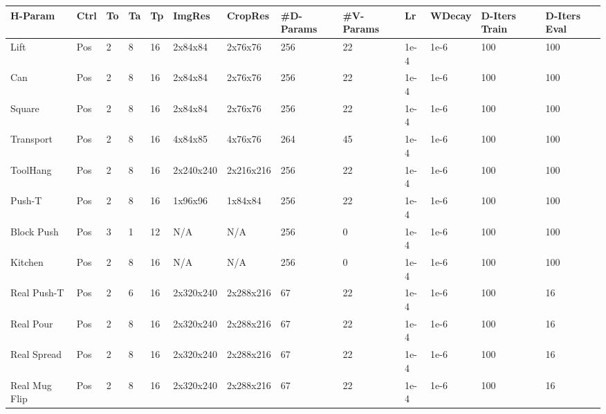 \setlength\tabcolsep{3 pt}
\small
\begin{tabular}{l|llllllllllll}
\toprule
           
\textbf{H-Param} & \textbf{Ctrl} & \textbf{To} & \textbf{Ta} & \textbf{Tp} & \textbf{ImgRes} & \textbf{CropRes} & \textbf{\#D-Params} & \textbf{\#V-Params} & \textbf{Lr} & \textbf{WDecay} & \textbf{D-Iters Train} & \textbf{D-Iters Eval} \\

\midrule
Lift       & Pos  & 2  & 8  & 16 & 2x84x84   & 2x76x76   & 256      & 22       & 1e-4 & 1e-6   & 100           & 100          \\
Can        & Pos  & 2  & 8  & 16 & 2x84x84   & 2x76x76   & 256      & 22       & 1e-4 & 1e-6   & 100           & 100          \\
Square     & Pos  & 2  & 8  & 16 & 2x84x84   & 2x76x76   & 256      & 22       & 1e-4 & 1e-6   & 100           & 100          \\
Transport  & Pos  & 2  & 8  & 16 & 4x84x85   & 4x76x76   & 264      & 45       & 1e-4 & 1e-6   & 100           & 100          \\
ToolHang   & Pos  & 2  & 8  & 16 & 2x240x240 & 2x216x216 & 256      & 22       & 1e-4 & 1e-6   & 100           & 100          \\
Push-T     & Pos  & 2  & 8  & 16 & 1x96x96   & 1x84x84   & 256      & 22       & 1e-4 & 1e-6   & 100           & 100          \\
Block Push & Pos  & 3  & 1  & 12 & N/A       & N/A       & 256      & 0        & 1e-4 & 1e-6   & 100           & 100          \\
Kitchen    & Pos  & 2  & 8  & 16 & N/A       & N/A       & 256      & 0        & 1e-4 & 1e-6   & 100           & 100          \\
\midrule
Real Push-T     & Pos  & 2  & 6  & 16 & 2x320x240 & 2x288x216 & 67       & 22       & 1e-4 & 1e-6   & 100           & 16           \\
Real Pour       & Pos  & 2  & 8  & 16 & 2x320x240 & 2x288x216 & 67       & 22       & 1e-4 & 1e-6   & 100           & 16           \\
Real Spread     & Pos  & 2  & 8  & 16 & 2x320x240 & 2x288x216 & 67       & 22       & 1e-4 & 1e-6   & 100           & 16           \\
Real Mug Flip   & Pos  & 2  & 8  & 16 & 2x320x240 & 2x288x216 & 67       & 22       & 1e-4 & 1e-6   & 100           & 16           \\
\bottomrule
\end{tabular}